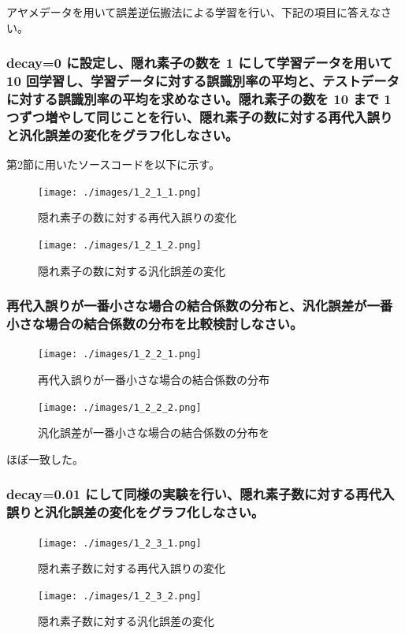 \documentclass{ltjsarticle}
\begin{document}
アヤメデータを用いて誤差逆伝搬法による学習を行い、下記の項目に答えなさい。

\subsubsection{decay=0 に設定し、隠れ素子の数を 1 にして学習データを用いて 10 回学習し、学習データに対する誤識別率の平均と、テストデータに対する誤識別率の平均を求めなさい。隠れ素子の数を 10 まで 1 つずつ増やして同じことを行い、隠れ素子の数に対する再代入誤りと汎化誤差の変化をグラフ化しなさい。}
第2節に用いたソースコードを以下に示す。

\begin{figure}[H]
	\centering
	\texttt{[image: ./images/1\_2\_1\_1.png]}
	\caption{隠れ素子の数に対する再代入誤りの変化}
\end{figure}
\begin{figure}[H]
	\centering
	\texttt{[image: ./images/1\_2\_1\_2.png]}
	\caption{隠れ素子の数に対する汎化誤差の変化}
\end{figure}

\subsubsection{再代入誤りが一番小さな場合の結合係数の分布と、汎化誤差が一番小さな場合の結合係数の分布を比較検討しなさい。}
\begin{figure}[H]
	\centering
	\texttt{[image: ./images/1\_2\_2\_1.png]}
	\caption{再代入誤りが一番小さな場合の結合係数の分布}
\end{figure}
\begin{figure}[H]
	\centering
	\texttt{[image: ./images/1\_2\_2\_2.png]}
	\caption{汎化誤差が一番小さな場合の結合係数の分布を}
\end{figure}
ほぼ一致した。

\subsubsection{decay=0.01 にして同様の実験を行い、隠れ素子数に対する再代入誤りと汎化誤差の変化をグラフ化しなさい。}
\begin{figure}[H]
	\centering
	\texttt{[image: ./images/1\_2\_3\_1.png]}
	\caption{隠れ素子数に対する再代入誤りの変化}
\end{figure}
\begin{figure}[H]
	\centering
	\texttt{[image: ./images/1\_2\_3\_2.png]}
	\caption{隠れ素子数に対する汎化誤差の変化}
\end{figure}
\end{document}
